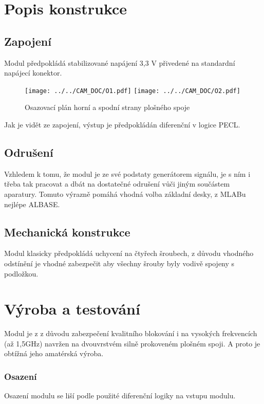 \documentclass[12pt,a4paper,oneside]{article}
\begin{document}
\section{Popis konstrukce}
\subsection{Zapojení}

Modul předpokládá stabilizované napájení 3,3 V přivedené na standardní napájecí konektor.

\begin{figure} [h!tbp]
  \centering
  \texttt{[image: ../../CAM\_DOC/O1.pdf]}
  \texttt{[image: ../../CAM\_DOC/O2.pdf]}
  \caption{Osazovací plán horní a spodní strany plošného spoje}
  \label{fig:osazovaci_plan}
\end{figure}




Jak je vidět ze zapojení, výstup je předpokládán diferenční v logice PECL. 

\subsection{Odrušení}

Vzhledem k tomu, že modul je ze své podstaty generátorem signálu, je s ním i třeba tak pracovat a dbát na dostatečné odrušení vůči jiným součástem aparatury. Tomuto výrazně pomáhá vhodná volba základní desky, z MLABu nejlépe ALBASE.

\subsection{Mechanická konstrukce}

Modul klasicky předpokládá uchycení na čtyřech šroubech, z důvodu vhodného odstínění je vhodné zabezpečit aby všechny šrouby byly vodivě spojeny s podložkou.  

\section{Výroba a testování}
Modul je z z důvodu zabezpečení kvalitního blokování i na vysokých frekvencích (až 1,5GHz) navržen na dvouvrstvém silně prokoveném plošném spoji. A proto je obtížná jeho amatérská výroba.

\subsubsection{Osazení}

Osazení modulu se liší podle použité diferenční logiky na vstupu modulu. 
\end{document}
